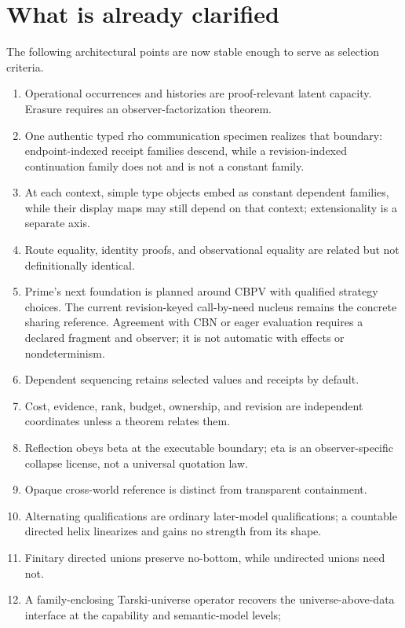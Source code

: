 \documentclass[11pt]{article}
\theoremstyle{definition}
\theoremstyle{remark}
\begin{document}
\section{What is already clarified}

The following architectural points are now stable enough to serve as selection
criteria.

\begin{enumerate}
\item Operational occurrences and histories are proof-relevant latent capacity.
  Erasure requires an observer-factorization theorem.
\item One authentic typed rho communication specimen realizes that boundary:
  endpoint-indexed receipt families descend, while a revision-indexed
  continuation family does not and is not a constant family.
\item At each context, simple type objects embed as constant dependent
  families, while their display maps may still depend on that context;
  extensionality is a separate axis.
\item Route equality, identity proofs, and observational equality are related but
  not definitionally identical.
\item Prime's next foundation is planned around CBPV with qualified strategy
  choices. The current revision-keyed call-by-need nucleus remains the concrete
  sharing reference. Agreement with CBN or eager evaluation requires a declared
  fragment and observer; it is not automatic with effects or nondeterminism.
\item Dependent sequencing retains selected values and receipts by default.
\item Cost, evidence, rank, budget, ownership, and revision are independent
  coordinates unless a theorem relates them.
\item Reflection obeys beta at the executable boundary; eta is an
  observer-specific collapse license, not a universal quotation law.
\item Opaque cross-world reference is distinct from transparent containment.
\item Alternating qualifications are ordinary later-model qualifications; a
  countable directed helix linearizes and gains no strength from its shape.
\item Finitary directed unions preserve no-bottom, while undirected unions need
  not.
\item A family-enclosing Tarski-universe operator recovers the
  universe-above-data interface at the capability and semantic-model levels;

\end{enumerate}
\end{document}
